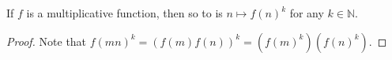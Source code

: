 \begin{theorem}
\label{powOfMultiplicative_isMultiplicative}
\leanok
If $f$ is a multiplicative function, then so to is $n\mapsto f(n)^k$ for any $k\in\mathbb{N}$.
\end{theorem}
\begin{proof}
\leanok
Note that $f(mn)^k=(f(m)f(n))^k=(f(m)^k)(f(n)^k)$.
\end{proof}
